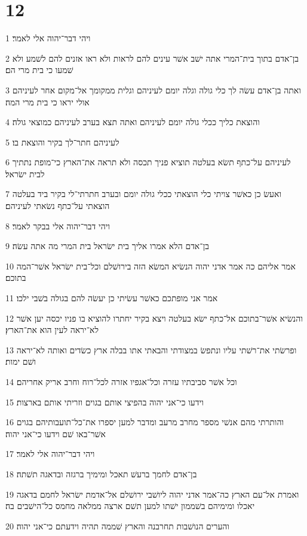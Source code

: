 \chapter{12}

\par 1 ויהי דבר־יהוה אלי לאמר׃
\par 2 בן־אדם בתוך בית־המרי אתה ישׁב אשׁר עינים להם לראות ולא ראו אזנים להם לשׁמע ולא שׁמעו כי בית מרי הם׃
\par 3 ואתה בן־אדם עשׂה לך כלי גולה וגלה יומם לעיניהם וגלית ממקומך אל־מקום אחר לעיניהם אולי יראו כי בית מרי המה׃
\par 4 והוצאת כליך ככלי גולה יומם לעיניהם ואתה תצא בערב לעיניהם כמוצאי גולה׃
\par 5 לעיניהם חתר־לך בקיר והוצאת בו׃
\par 6 לעיניהם על־כתף תשׂא בעלטה תוציא פניך תכסה ולא תראה את־הארץ כי־מופת נתתיך לבית ישׂראל׃
\par 7 ואעשׂ כן כאשׁר צויתי כלי הוצאתי ככלי גולה יומם ובערב חתרתי־לי בקיר ביד בעלטה הוצאתי על־כתף נשׂאתי לעיניהם׃
\par 8 ויהי דבר־יהוה אלי בבקר לאמר׃
\par 9 בן־אדם הלא אמרו אליך בית ישׂראל בית המרי מה אתה עשׂה׃
\par 10 אמר אליהם כה אמר אדני יהוה הנשׂיא המשׂא הזה בירושׁלם וכל־בית ישׂראל אשׁר־המה בתוכם׃
\par 11 אמר אני מופתכם כאשׁר עשׂיתי כן יעשׂה להם בגולה בשׁבי ילכו׃
\par 12 והנשׂיא אשׁר־בתוכם אל־כתף ישׂא בעלטה ויצא בקיר יחתרו להוציא בו פניו יכסה יען אשׁר לא־יראה לעין הוא את־הארץ׃
\par 13 ופרשׂתי את־רשׁתי עליו ונתפשׂ במצודתי והבאתי אתו בבלה ארץ כשׂדים ואותה לא־יראה ושׁם ימות׃
\par 14 וכל אשׁר סביבתיו עזרה וכל־אגפיו אזרה לכל־רוח וחרב אריק אחריהם׃
\par 15 וידעו כי־אני יהוה בהפיצי אותם בגוים וזריתי אותם בארצות׃
\par 16 והותרתי מהם אנשׁי מספר מחרב מרעב ומדבר למען יספרו את־כל־תועבותיהם בגוים אשׁר־באו שׁם וידעו כי־אני יהוה׃
\par 17 ויהי דבר־יהוה אלי לאמר׃
\par 18 בן־אדם לחמך ברעשׁ תאכל ומימיך ברגזה ובדאגה תשׁתה׃
\par 19 ואמרת אל־עם הארץ כה־אמר אדני יהוה ליושׁבי ירושׁלם אל־אדמת ישׂראל לחמם בדאגה יאכלו ומימיהם בשׁממון ישׁתו למען תשׁם ארצה ממלאה מחמס כל־הישׁבים בה׃
\par 20 והערים הנושׁבות תחרבנה והארץ שׁממה תהיה וידעתם כי־אני יהוה׃
